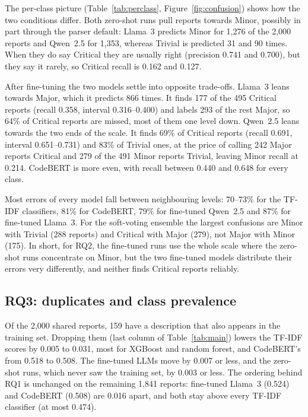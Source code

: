 \documentclass[a4paper,fleqn]{cas-sc}
\begin{document}
The per-class picture (Table~\ref{tab:perclass}, Figure~\ref{fig:confusion}) shows
how the two conditions differ. Both zero-shot runs pull reports towards Minor, possibly
in part through the parser default: Llama~3 predicts Minor for 1,276 of the 2,000
reports and Qwen~2.5 for 1,353, whereas Trivial is predicted 31 and 90 times. When they do say Critical they are usually right (precision
0.741 and 0.700), but they say it rarely, so Critical recall is 0.162 and 0.127.

After fine-tuning the two models settle into opposite trade-offs. Llama~3 leans
towards Major, which it predicts 866 times. It finds 177 of the 495 Critical reports
(recall 0.358, interval 0.316--0.400) and labels 293 of the rest Major, so 64\% of
Critical reports are missed, most of them one level down. Qwen~2.5 leans towards the
two ends of the scale. It finds 69\% of Critical reports (recall 0.691, interval
0.651--0.731) and 83\% of Trivial ones, at the price of calling 242 Major reports
Critical and 279 of the 491 Minor reports Trivial, leaving Minor recall at 0.214.
CodeBERT is more even, with recall between 0.440 and 0.648 for every class.

Most errors of every model fall between neighbouring levels: 70--73\% for the TF-IDF
classifiers, 81\% for CodeBERT, 79\% for fine-tuned Qwen~2.5 and 87\% for fine-tuned
Llama~3. For the soft-voting ensemble the largest confusions are Minor with Trivial
(288 reports) and Critical with Major (279), not Major with Minor (175). In short, for
RQ2, the fine-tuned runs use the whole scale where the zero-shot runs concentrate on Minor,
but the two fine-tuned models distribute their errors very differently, and neither
finds Critical reports reliably.

\subsection{RQ3: duplicates and class prevalence}
\label{sec:res_sensitivity}

Of the 2,000 shared reports, 159 have a description that also appears in the training
set. Dropping them (last column of Table~\ref{tab:main}) lowers the TF-IDF scores by
0.005 to 0.031, most for XGBoost and random forest, and CodeBERT's from 0.518 to 0.508.
The fine-tuned LLMs move by 0.007 or less, and the zero-shot runs, which never saw the
training set, by 0.003 or less. The ordering behind RQ1 is unchanged on the remaining
1,841 reports: fine-tuned Llama~3 (0.524) and CodeBERT (0.508) are 0.016 apart, and both
stay above every TF-IDF classifier (at most 0.474).
\end{document}
